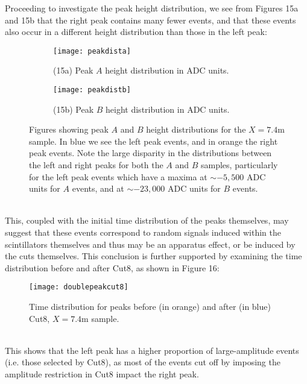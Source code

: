 \documentclass[a4paper]{article}
\begin{document}
\newpage \noindent
Proceeding to investigate the peak height distribution, we see from Figures 15a and 15b that the right peak contains many fewer events, and that these events also occur in a different height distribution than those in the left peak:
\begin{figure}[h!]
\centering
	 \begin{subfigure}[t!]{0.6\textwidth}
		 \centering
		 \texttt{[image: peakdista]}
		 \caption*{(15a) Peak $A$ height distribution in ADC units.}
	 \end{subfigure}
	 \hfill
	 \begin{subfigure}[t!]{0.6\textwidth}
		 \centering
		 \texttt{[image: peakdistb]}
		 \caption*{(15b) Peak $B$ height distribution in ADC units.}
	 \end{subfigure}
	 \caption{Figures showing peak $A$ and $B$ height distributions for the $X=7.4$m sample. In blue we see the left peak events, and in orange the right peak events. Note the large disparity in the distributions between the left and right peaks for both the $A$ and $B$ samples, particularly for the left peak events which have a maxima at $\sim -5,500$ ADC units for $A$ events, and at $\sim -23,000$ ADC units for $B$ events.}
\end{figure}
\\%
This, coupled with the initial time distribution of the peaks themselves, may suggest that these events correspond to random signals induced within the scintillators themselves and thus may be an apparatus effect, or be induced by the cuts themselves. This conclusion is further supported by examining the time distribution before and after Cut8, as shown in Figure 16:
\begin{figure}[h!]
\begin{center}
	\texttt{[image: doublepeakcut8]}
\end{center}
\caption{Time distribution for peaks before (in orange) and after (in blue) Cut8, $X=7.4$m sample.}
\end{figure}
\\
\noindent This shows that the left peak has a higher proportion of large-amplitude events (i.e. those selected by Cut8), as most of the events cut off by imposing the amplitude restriction in Cut8 impact the right peak.
\newpage
\end{document}
